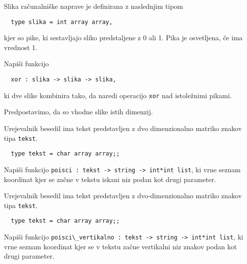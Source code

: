 \begin{ex}
  Slika ra\v cunalni\v ske naprave je definirana z naslednjim tipom

\begin{lstlisting}
  type slika = int array array,
\end{lstlisting}

  kjer so pike, ki sestavljajo sliko predstaljene z 0 ali 1. Pika je
  osvetljena, \v ce ima vrednost 1.

  Napi\v si funkcijo

\begin{lstlisting}
  xor : slika -> slika -> slika,
\end{lstlisting}

  ki dve slike kombinira tako, da naredi operacijo \lstinline{xor} nad
  istole\v znimi pikami.

  Predpostavimo, da so vhodne slike istih dimenzij.


\end{ex} 
\begin{ex}
  Urejevalnik besedil ima tekst predstavljen z dvo dimenzionalno
  matriko znakov tipa \lstinline{tekst}.

\begin{lstlisting}
  type tekst = char array array;;
\end{lstlisting}
  Napi\v si funkcijo 
  \lstinline{poisci : tekst -> string -> int*int list}, 
  ki vrne seznam koordinat kjer se 
  za\v cne v tekstu iskani niz
  podan kot drugi parameter. 


\end{ex} 
\begin{ex}
  Urejevalnik besedil ima tekst predstavljen z dvo-dimenzionalno
  matriko znakov tipa \lstinline{tekst}.

\begin{lstlisting}
  type tekst = char array array;;
\end{lstlisting}

  Napi\v si funkcijo 
  \lstinline{poisci\_vertikalno : tekst -> string -> int*int list}, 
  ki vrne seznam koordinat kjer se v tekstu za\v cne
  vertikalni niz znakov podan kot drugi parameter.


\end{ex} 
